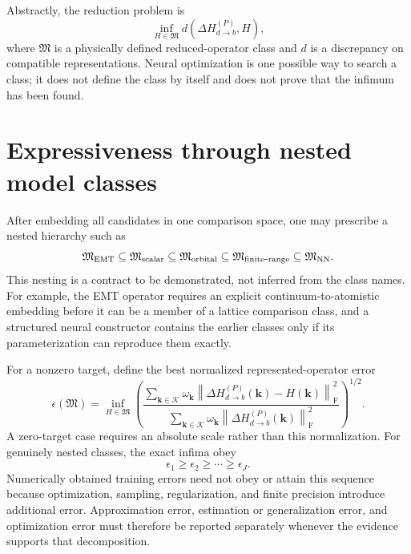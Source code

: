 Abstractly, the reduction problem is
\begin{equation}
  \inf_{H\in\mathfrak M}
  d\!\left(\Delta H_{d\to b}^{(P)},H\right),
  \label{eq:model-class-infimum}
\end{equation}
where $\mathfrak M$ is a physically defined reduced-operator class and $d$ is a
discrepancy on compatible representations. Neural optimization is one possible
way to search a class; it does not define the class by itself and does not prove
that the infimum has been found.

\section{Expressiveness through nested model classes}

After embedding all candidates in one comparison space, one may prescribe a
nested hierarchy such as
\begin{equation}
  \mathfrak M_{\rm EMT}
  \subseteq
  \mathfrak M_{\rm scalar}
  \subseteq
  \mathfrak M_{\rm orbital}
  \subseteq
  \mathfrak M_{\rm finite\mbox{-}range}
  \subseteq
  \mathfrak M_{\rm NN}.
  \label{eq:learning-model-hierarchy}
\end{equation}
This nesting is a contract to be demonstrated, not inferred from the class
names. For example, the EMT operator requires an explicit continuum-to-atomistic
embedding before it can be a member of a lattice comparison class, and a
structured neural constructor contains the earlier classes only if its
parameterization can reproduce them exactly.

For a nonzero target, define the best normalized represented-operator error
\begin{equation}
  \epsilon(\mathfrak M)
  =
  \inf_{H\in\mathfrak M}
  \left(
  \frac{
    \sum_{\mathbf k\in\mathcal K}
    \omega_{\mathbf k}
    \left\|\Delta H_{d\to b}^{(P)}(\mathbf k)-H(\mathbf k)\right\|_{\mathrm F}^{2}
  }{
    \sum_{\mathbf k\in\mathcal K}
    \omega_{\mathbf k}
    \left\|\Delta H_{d\to b}^{(P)}(\mathbf k)\right\|_{\mathrm F}^{2}
  }
  \right)^{1/2}.
  \label{eq:model-class-error}
\end{equation}
A zero-target case requires an absolute scale rather than this normalization.
For genuinely nested classes, the exact infima obey
\begin{equation}
  \epsilon_1\geq\epsilon_2\geq\cdots\geq\epsilon_J.
\end{equation}
Numerically obtained training errors need not obey or attain this sequence
because optimization, sampling, regularization, and finite precision introduce
additional error. Approximation error, estimation or generalization error, and
optimization error must therefore be reported separately whenever the evidence
supports that decomposition.

